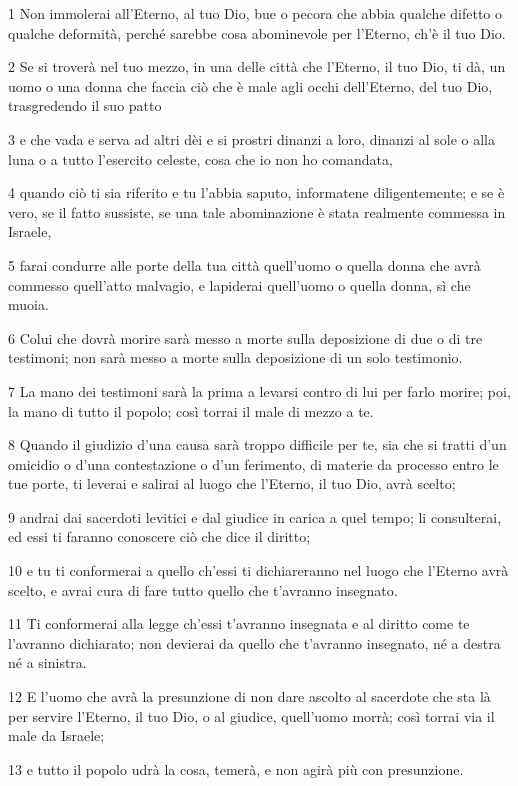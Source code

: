 \par 1 Non immolerai all'Eterno, al tuo Dio, bue o pecora che abbia qualche difetto o qualche deformità, perché sarebbe cosa abominevole per l'Eterno, ch'è il tuo Dio.
\par 2 Se si troverà nel tuo mezzo, in una delle città che l'Eterno, il tuo Dio, ti dà, un uomo o una donna che faccia ciò che è male agli occhi dell'Eterno, del tuo Dio, trasgredendo il suo patto
\par 3 e che vada e serva ad altri dèi e si prostri dinanzi a loro, dinanzi al sole o alla luna o a tutto l'esercito celeste, cosa che io non ho comandata,
\par 4 quando ciò ti sia riferito e tu l'abbia saputo, informatene diligentemente; e se è vero, se il fatto sussiste, se una tale abominazione è stata realmente commessa in Israele,
\par 5 farai condurre alle porte della tua città quell'uomo o quella donna che avrà commesso quell'atto malvagio, e lapiderai quell'uomo o quella donna, sì che muoia.
\par 6 Colui che dovrà morire sarà messo a morte sulla deposizione di due o di tre testimoni; non sarà messo a morte sulla deposizione di un solo testimonio.
\par 7 La mano dei testimoni sarà la prima a levarsi contro di lui per farlo morire; poi, la mano di tutto il popolo; così torrai il male di mezzo a te.
\par 8 Quando il giudizio d'una causa sarà troppo difficile per te, sia che si tratti d'un omicidio o d'una contestazione o d'un ferimento, di materie da processo entro le tue porte, ti leverai e salirai al luogo che l'Eterno, il tuo Dio, avrà scelto;
\par 9 andrai dai sacerdoti levitici e dal giudice in carica a quel tempo; li consulterai, ed essi ti faranno conoscere ciò che dice il diritto;
\par 10 e tu ti conformerai a quello ch'essi ti dichiareranno nel luogo che l'Eterno avrà scelto, e avrai cura di fare tutto quello che t'avranno insegnato.
\par 11 Ti conformerai alla legge ch'essi t'avranno insegnata e al diritto come te l'avranno dichiarato; non devierai da quello che t'avranno insegnato, né a destra né a sinistra.
\par 12 E l'uomo che avrà la presunzione di non dare ascolto al sacerdote che sta là per servire l'Eterno, il tuo Dio, o al giudice, quell'uomo morrà; così torrai via il male da Israele;
\par 13 e tutto il popolo udrà la cosa, temerà, e non agirà più con presunzione.
